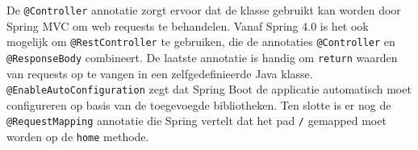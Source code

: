 De \texttt{@Controller} annotatie zorgt ervoor dat de klasse gebruikt kan worden door Spring MVC om web requests te behandelen. Vanaf Spring 4.0 is het ook mogelijk om \texttt{@RestController} te gebruiken, die de annotaties \texttt{@Controller} en \texttt{@ResponseBody} combineert. De laatste annotatie is handig om \texttt{return} waarden van requests op te vangen in een zelfgedefinieerde Java klasse. \texttt{@EnableAutoConfiguration} zegt dat Spring Boot de applicatie automatisch moet configureren op basis van de toegevoegde bibliotheken. Ten slotte is er nog de \texttt{@RequestMapping} annotatie die Spring vertelt dat het pad \texttt{/} gemapped moet worden op de \texttt{home} methode. \\


